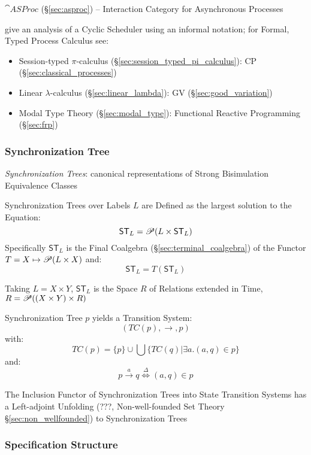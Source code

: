 $\cat{ASProc}$ (\S\ref{sec:asproc}) -- Interaction Category for
Asynchronous Processes

\fist \cite{abramsky-gay-nagarajan96} give an analysis of a Cyclic
Scheduler using an informal notation; for Formal, Typed Process
Calculus see:
\begin{itemize}
  \item Session-typed $\pi$-calculus
    (\S\ref{sec:session_typed_pi_calculus}): CP
    (\S\ref{sec:classical_processes})
  \item Linear $\lambda$-calculus (\S\ref{sec:linear_lambda}): GV
    (\S\ref{sec:good_variation})
  \item Modal Type Theory (\S\ref{sec:modal_type}): Functional
    Reactive Programming (\S\ref{sec:frp})
\end{itemize}



\subsubsection{Synchronization Tree}\label{sec:synchronization_tree}

\emph{Synchronization Trees}: canonical representations of Strong
Bisimulation Equivalence Classes

Synchronization Trees over Labels $L$ are Defined as the largest
solution to the Equation:
\[
  \mathsf{ST}_L = \mathscr{P}(L \times \mathsf{ST}_L)
\]
Specifically $\mathsf{ST}_L$ is the Final Coalgebra
(\S\ref{sec:terminal_coalgebra}) of the Functor $T = X \mapsto \mathscr{P}(L
\times X)$ and:
\[
  \mathsf{ST}_L = T(\mathsf{ST}_L)
\]

Taking $L = X \times Y$, $\mathsf{ST}_L$ is the Space $R$ of Relations
extended in Time, $R = \mathscr{P}((X \times Y) \times R)$

Synchronization Tree $p$ yields a Transition System:
\[
  (TC(p), \rightarrow, p)
\]
with:
\[
  TC(p) = \{p\} \cup \bigcup\{TC(q) | \exists a.(a,q) \in p\}
\]
and:
\[
  p \xrightarrow{a} q \stackrel{\Delta}\Longleftrightarrow (a,q) \in p
\]

The Inclusion Functor of Synchronization Trees into State Transition
Systems has a Left-adjoint Unfolding (???, Non-well-founded Set Theory
\S\ref{sec:non_wellfounded}) to Synchronization Trees



\subsubsection{Specification Structure}
\label{sec:specification_structure}
\cite{abramsky-gay-nagarajan96}

